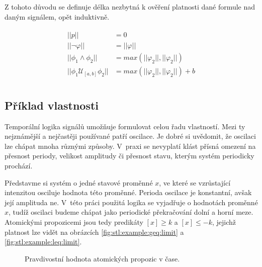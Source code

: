 Z tohoto důvodu se definuje délka nezbytná k ověření platnosti dané formule nad daným signálem,
opět induktivně.

\begin{align}\label{eq:stl:min:length}
\begin{array}{ll}
||p||									&= 0									\\
||\neg\varphi||							&= ||\varphi||							\\
||\phi_1 \wedge \phi_2||				&= max(||\varphi_2||,||\varphi_2||) 	\\
||\phi_1 \mathcal{U}_{[a,b]} \phi_2||	&= max(||\varphi_2||,||\varphi_2||) + b	\\
\end{array}
\end{align}

\subsection{Příklad vlastnosti}\label{section:stl:example}

Temporální logika signálů umožňuje formulovat celou řadu vlastností. Me\-zi ty
nejznámější a nejčastěji používané patří oscilace. Je dobré si u\-vě\-do\-mit, že oscilaci
lze chápat mnoha různými způsoby. V~praxi se nevyplatí klást přísná omezení na přesnost
periody, velikost amplitudy či přesnost stavu, kterým systém periodicky prochází. 

Představme si systém o jedné stavové proměnné $x$, ve které se vzrů\-sta\-jí\-cí intenzitou
osciluje hodnota této proměnné. Perioda oscilace je konstantní, avšak její amplituda ne. V~této práci
použitá logika se vyjadřuje o hodnotách proměnné $x$, tudíž oscilaci budeme
chápat jako periodické pře\-kra\-čo\-vá\-ní dolní a horní meze. Atomickými propozicemi jsou tedy
predikáty $[x] \geq k$ a $[x] \leq -k$, jejichž platnost lze vidět na obrázcích
\ref{fig:stl:example:geq:limit} a \ref{fig:stl:example:leq:limit}.

\begin{figure}[t]
\begin{center}
\caption{Pravdivostní hodnota atomických propozic v čase.}
\end{center}
\end{figure}

